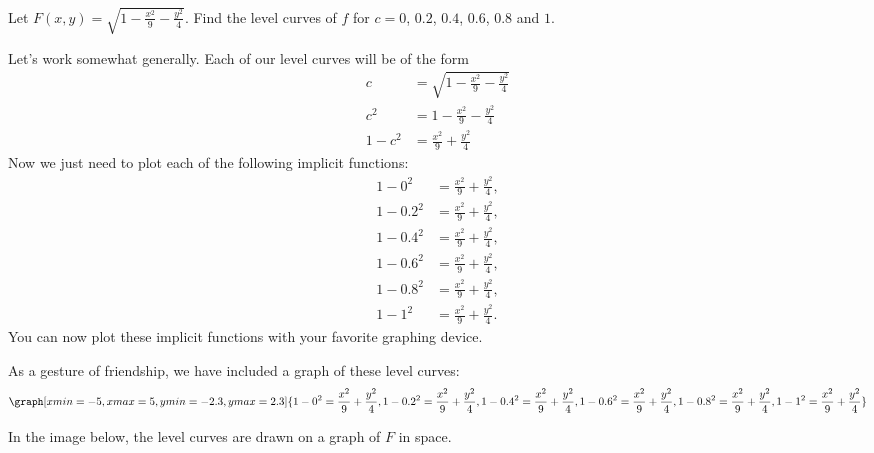 \documentclass{ximera}
\begin{document}
\begin{example}
  Let $F(x,y) = \sqrt{1-\frac{x^2}{9}-\frac{y^2}{4}}$. Find the level
  curves of $f$ for $c=0$, $0.2$, $0.4$, $0.6$, $0.8$ and $1$.
  \begin{explanation}
    Let's work somewhat generally. Each of our level curves will be of
    the form
    \begin{align*}
      c &= \sqrt{1-\frac{x^2}{9}-\frac{y^2}{4}}\\
        c^2 &= 1-\frac{x^2}{9}-\frac{y^2}{4}\\
        1-c^2 &= \frac{x^2}{9}+\frac{y^2}{4}      
    \end{align*}
    Now we just need to plot each of the following implicit functions:
    \begin{align*}
      1 - 0^2   &= \frac{x^2}{9}+\frac{y^2}{4}, \\
      1 - 0.2^2 &= \frac{x^2}{9}+\frac{y^2}{4}, \\
      1 - 0.4^2 &= \frac{x^2}{9}+\frac{y^2}{4}, \\
      1 - 0.6^2 &= \frac{x^2}{9}+\frac{y^2}{4}, \\
      1 - 0.8^2 &= \frac{x^2}{9}+\frac{y^2}{4}, \\
        1 - 1^2 &= \frac{x^2}{9}+\frac{y^2}{4}.   
    \end{align*}
    You can now plot these implicit functions with your favorite
    graphing device.
    \begin{onlineOnly}
      As a gesture of friendship, we have included a graph of these
      level curves:
      \[
      \graph[xmin=-5, xmax=5, ymin=-2.3, ymax=2.3]{1-0^2= \frac{x^2}{9}+\frac{y^2}{4}, 1 - 0.2^2 = \frac{x^2}{9}+\frac{y^2}{4},1 - 0.4^2 = \frac{x^2}{9}+\frac{y^2}{4},1 - 0.6^2 = \frac{x^2}{9}+\frac{y^2}{4},1 - 0.8^2 = \frac{x^2}{9}+\frac{y^2}{4},1 - 1^2 = \frac{x^2}{9}+\frac{y^2}{4}}
      \]
    \end{onlineOnly}
    In the image below, the level curves are drawn on a graph of $F$
    in space.
    \begin{image}
\end{image}
\end{explanation}
\end{example}
\end{document}

